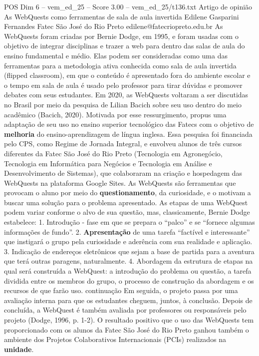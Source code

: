 \begin{textsample}{POS Dim 6 – vem\_ed\_25 – Score 3.00 – vem\_ed\_25/t136.txt}  \label{ex:f6_pos_095}
Artigo de opinião As WebQuests como ferramentas de sala de aula invertida Edilene Gasparini Fernandes Fatec São José do Rio Preto edilene@fatecriopreto.edu.br As WebQuests foram criadas por Bernie Dodge, em 1995, e foram usadas com o objetivo de integrar disciplinas e trazer a web para dentro das salas de aula do ensino fundamental e médio.
Elas podem ser consideradas como uma das ferramentas para a metodologia ativa conhecida como sala de aula invertida (flipped classroom), em que o conteúdo é apresentado fora do ambiente escolar e o tempo em sala de aula é usado pelo professor para tirar dúvidas e promover debates com seus estudantes.
Em 2020, as WebQuests voltaram a ser discutidas no Brasil por meio da pesquisa de Lilian Bacich sobre seu uso dentro do meio acadêmico (Bacich, 2020).
Motivada por esse ressurgimento, propus uma adaptação de seu uso no ensino superior tecnológico das Fatecs com o objetivo de \textbf{melhoria} do ensino-aprendizagem de língua inglesa.
Essa pesquisa foi financiada pelo CPS, como Regime de Jornada Integral, e envolveu alunos de três cursos diferentes da Fatec São José do Rio Preto (Tecnologia em Agronegócio, Tecnologia em Informática para Negócios e Tecnologia em Análise e Desenvolvimento de Sistemas), que colaboraram na criação e hospedagem das WebQuests na plataforma Google Sites.
As WebQuests são ferramentas que provocam o aluno por meio do \textbf{questionamento}, da curiosidade, e o motivam a buscar uma solução para o problema apresentado.
As etapas de uma WebQuest podem variar conforme o alvo de sua questão, mas, classicamente, Bernie Dodge estabelece: 1.
Introdução - fase em que se prepara o “palco” e se “fornece algumas informações de fundo”. 2. \textbf{Apresentação} de uma tarefa “factível e interessante” que instigará o grupo pela curiosidade e aderência com sua realidade e aplicação. 3.
Indicação de endereços eletrônicos que sejam a base de partida para a aventura que terá outras paragens, naturalmente. 4.
Abordagem da estrutura de etapas na qual será construída a WebQuest: a introdução do problema ou questão, a tarefa dividida entre os membros do grupo, o processo de construção da abordagem e os recursos de que farão uso. continuação Em seguida, o projeto passa por uma avaliação interna para que os estudantes cheguem, juntos, à conclusão.
Depois de concluída, a WebQuest é também avaliada por professores ou responsáveis pelo projeto (Dodge, 1996, p. 1-2).
O resultado positivo que o uso das WebQuests tem proporcionado com os alunos da Fatec São José do Rio Preto ganhou também o ambiente dos Projetos Colaborativos Internacionais (PCIs) realizados na \textbf{unidade}.

\end{textsample}
